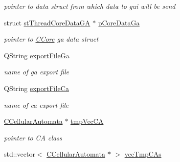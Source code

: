 \begin{DoxyCompactItemize}
\begin{DoxyCompactList}\small\item\em pointer to data struct from which data to gui will be send \item\end{DoxyCompactList}\item 
\hypertarget{classCThreadCore_abf3c30352d0c198c224177d6638f3d95}{
struct \hyperlink{structstThreadCoreDataGA}{stThreadCoreDataGA} $\ast$ \hyperlink{classCThreadCore_abf3c30352d0c198c224177d6638f3d95}{pCoreDataGa}}
\label{classCThreadCore_abf3c30352d0c198c224177d6638f3d95}

\begin{DoxyCompactList}\small\item\em pointer to \hyperlink{classCCore}{CCore} ga data struct \item\end{DoxyCompactList}\item 
\hypertarget{classCThreadCore_a5139054ea143d81458c0c5827623495b}{
QString \hyperlink{classCThreadCore_a5139054ea143d81458c0c5827623495b}{exportFileGa}}
\label{classCThreadCore_a5139054ea143d81458c0c5827623495b}

\begin{DoxyCompactList}\small\item\em name of ga export file \item\end{DoxyCompactList}\item 
\hypertarget{classCThreadCore_ad814a51d840bd6cad637664c2e9a9bd9}{
QString \hyperlink{classCThreadCore_ad814a51d840bd6cad637664c2e9a9bd9}{exportFileCa}}
\label{classCThreadCore_ad814a51d840bd6cad637664c2e9a9bd9}

\begin{DoxyCompactList}\small\item\em name of ca export file \item\end{DoxyCompactList}\item 
\hypertarget{classCThreadCore_a955bf734623372149659859157b456bf}{
\hyperlink{classCCellularAutomata}{CCellularAutomata} $\ast$ \hyperlink{classCThreadCore_a955bf734623372149659859157b456bf}{tmpVecCA}}
\label{classCThreadCore_a955bf734623372149659859157b456bf}

\begin{DoxyCompactList}\small\item\em pointer to CA class \item\end{DoxyCompactList}\item 
\hypertarget{classCThreadCore_aef7310c60e87ac0ee0a45e5b9220d14b}{
std::vector$<$ \hyperlink{classCCellularAutomata}{CCellularAutomata} $\ast$ $>$ \hyperlink{classCThreadCore_aef7310c60e87ac0ee0a45e5b9220d14b}{vecTmpCAs}}
\label{classCThreadCore_aef7310c60e87ac0ee0a45e5b9220d14b}


\end{DoxyCompactItemize}
